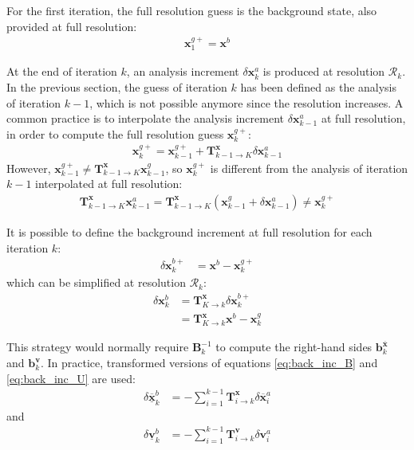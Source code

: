 \documentclass[12pt]{scrartcl}
\begin{document}
For the first iteration, the full resolution guess is the background state, also provided at full resolution:
\begin{align}
\mathbf{x}^{g+}_1 = \mathbf{x}^b
\end{align}

At the end of iteration $k$, an analysis increment $\delta \mathbf{x}^a_k$ is produced at resolution $\mathcal{R}_k$. In the previous section, the guess of iteration $k$ has been defined as the analysis of iteration $k-1$, which is not possible anymore since the resolution increases. A common practice is to interpolate the analysis increment $\delta \mathbf{x}^a_{k-1}$ at full resolution, in order to compute the full resolution guess $\mathbf{x}^{g+}_k$:
\begin{align}
\mathbf{x}^{g+}_k = \mathbf{x}^{g+}_{k-1} + \mathbf{T}^\mathbf{x}_{k-1 \rightarrow K} \delta \mathbf{x}^a_{k-1}
\end{align}
However, $\mathbf{x}^{g+}_{k-1} \ne \mathbf{T}^\mathbf{x}_{k-1 \rightarrow K} \mathbf{x}^g_{k-1}$, so $\mathbf{x}^{g+}_k$ is different from the analysis of iteration $k-1$ interpolated at full resolution:
\begin{align}
\mathbf{T}^\mathbf{x}_{k-1 \rightarrow K} \mathbf{x}^a_{k-1} = \mathbf{T}^\mathbf{x}_{k-1 \rightarrow K} \left(\mathbf{x}^g_{k-1} + \delta \mathbf{x}^a_{k-1} \right) \ne \mathbf{x}^{g+}_k
\end{align}

It is possible to define the background increment at full resolution for each iteration $k$:
\begin{align}
\delta \mathbf{x}^{b+}_k & = \mathbf{x}^b - \mathbf{x}^{g+}_k
\end{align}
which can be simplified at resolution $\mathcal{R}_k$:
\begin{align}
\delta \mathbf{x}^b_k & = \mathbf{T}^\mathbf{x}_{K \rightarrow k} \delta \mathbf{x}^{b+}_k \nonumber \\
& = \mathbf{T}^\mathbf{x}_{K \rightarrow k} \mathbf{x}^b - \mathbf{x}^{g}_k
\end{align}

This strategy would normally require $\mathbf{B}^{-1}_k$ to compute the right-hand sides $\mathbf{b}^{\overline{\mathbf{x}}}_k$ and $\mathbf{b}^\mathbf{v}_k$. In practice, transformed versions of equations \eqref{eq:back_inc_B} and \eqref{eq:back_inc_U} are used:
\begin{align}
\label{eq:back_inc_Bvar}
\delta \underline{\overline{\mathbf{x}}}^b_k & = - \sum_{i=1}^{k-1} \mathbf{T}^\mathbf{x}_{i \rightarrow k} \delta \overline{\mathbf{x}}^a_i
\end{align}
and 
\begin{align}
\label{eq:back_inc_Uvar}
\delta \underline{\mathbf{v}}^b_k & = - \sum_{i=1}^{k-1} \mathbf{T}^\mathbf{v}_{i \rightarrow k} \delta \mathbf{v}^a_i
\end{align}
\end{document}
